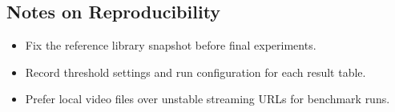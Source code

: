 \documentclass[12pt]{article}
\begin{document}
{\subsection{Notes on Reproducibility}

\begin{itemize}
    \item Fix the reference library snapshot before final experiments.
    \item Record threshold settings and run configuration for each result table.
    \item Prefer local video files over unstable streaming URLs for benchmark runs.
\end{itemize}

}
\end{document}

